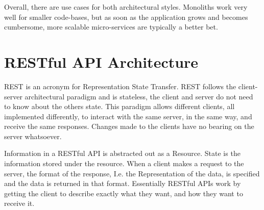 Overall, there are use cases for both architectural styles. Monoliths work very well for smaller code-bases, but as soon as the application grows and becomes cumbersome, more scalable micro-services are typically a better bet.
\section{RESTful API Architecture}
REST is an acronym for Representation State Transfer. REST follows the client-server architectural paradigm and is stateless, the client and server do not need to know about the others state. This paradigm allows different clients, all implemented differently, to interact with the same server, in the same way, and receive the same responses. Changes made to the clients have no bearing on the server whatsoever.

Information in a RESTful API is abstracted out as a Resource. State is the information stored under the resource. When a client makes a request to the server, the format of the response, I.e. the Representation of the data, is specified and the data is returned in that format. Essentially RESTful APIs work by getting the client to describe exactly what they want, and how they want to receive it.
